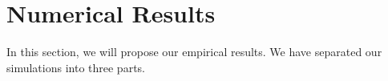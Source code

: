 \documentclass{article}
\theoremstyle{plain}
\theoremstyle{definition}
\theoremstyle{remark}
\begin{document}
\section{Numerical Results}\label{sec_numerical}
In this section, we will propose our empirical results. We have separated our simulations into three parts. 
\end{document}
